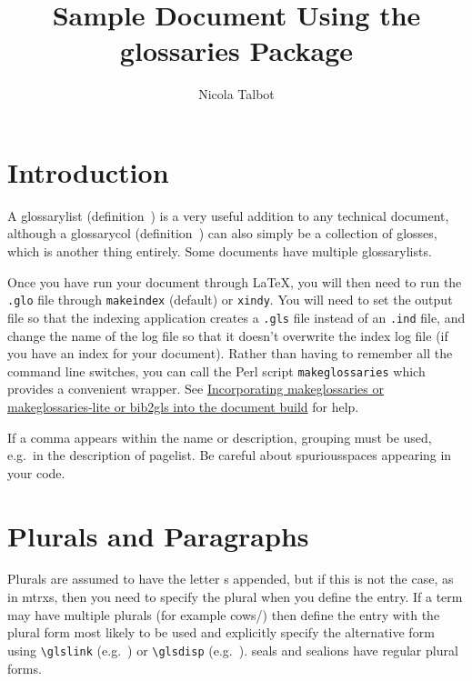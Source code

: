\documentclass[a4paper]{report}
\begin{document}
\title{Sample Document Using the glossaries Package}
\author{Nicola Talbot}
\maketitle

\tableofcontents

\chapter{Introduction}

A \gls{glossarylist} (definition~) is a
very useful addition to any technical document, although a
\gls{glossarycol} (definition~) can also
simply be a collection of glosses, which is another thing entirely.
Some documents have multiple \glspl{glossarylist}.

Once you have run your document through \LaTeX, you will then need
to run the \texttt{.glo} file through \texttt{makeindex} (default)
or \texttt{xindy}.  You will need to set the output file so that the
indexing application
creates a \texttt{.gls} file instead of an \texttt{.ind} file, and
change the name of the log file so that it doesn't overwrite the
index log file (if you have an index for your document).  Rather
than having to remember all the command line switches, you can call
the \gls{Perl} script \texttt{makeglossaries} which provides a
convenient wrapper. See
\href{https://www.dickimaw-books.com/latex/buildglossaries}{Incorporating makeglossaries or makeglossaries-lite or bib2gls into the document build} for help.

If a comma appears within the name or description, grouping
must be used, e.g.\ in the description of \gls{pagelist}.
Be careful about \glspl{spuriousspace} appearing in your code.

\chapter{Plurals and Paragraphs}

Plurals are assumed to have the letter s appended, but if this is
not the case, as in \glspl{mtrx}, then you need to specify the
plural when you define the entry. If a term may have multiple
plurals (for example \glspl{cow}/) then
define the entry with the plural form most likely to be used and
explicitly specify the alternative form using \verb|\glslink|
(e.g.\ )
or \verb|\glsdisp| (e.g.\ ).
\Glspl{seal} and \glspl{sealion} have regular plural forms.
\end{document}
